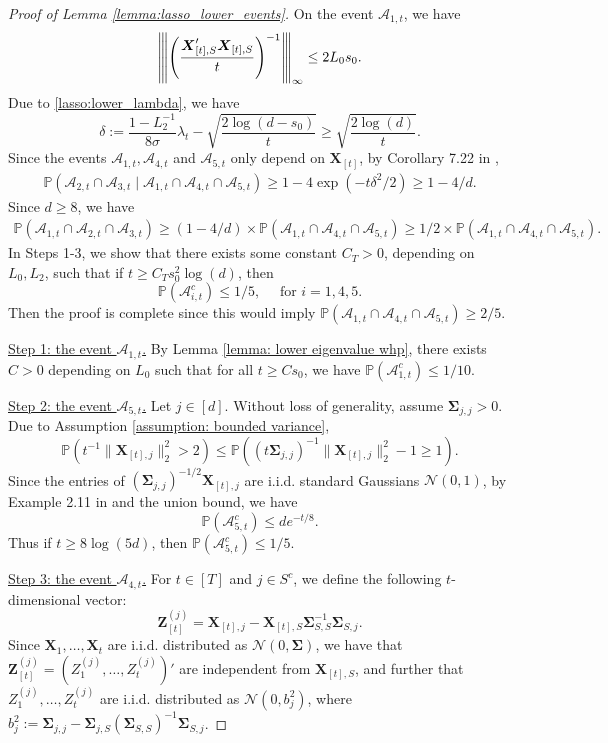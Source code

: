 \documentclass[aos,preprint]{imsart}
\theoremstyle{plain}
\theoremstyle{definition}
\newcommand{\bX}{\boldsymbol{X}}
\newcommand{\bSigma}{\boldsymbol{\Sigma}}
\newcommand{\op}[1]{{\left\vert\kern-0.25ex\left\vert\kern-0.25ex\left\vert #1\right\vert\kern-0.25ex\right\vert\kern-0.25ex\right\vert}}
\newcommand{\bZ}{\boldsymbol{Z}}
\newcommand{\cA}{\mathcal{A}}
\newcommand{\Pro}{\mathbb{P}}
\begin{document}
\begin{appendix}
\begin{proof}[Proof of Lemma \ref{lemma:lasso_lower_events}]
On the event $\cA_{1,t}$, we have
$$
\op{\left( \frac{\bX_{[t],S}'\bX_{[t],S}}{t}\right)^{-1}}_{\infty} \leq 2L_0 s_0.
$$
Due to \eqref{lasso:lower_lambda}, we have
$$
\delta := \frac{1-L_2^{-1}}{8 \sigma} \lambda_t - \sqrt{\frac{2\log(d-s_0)}{t}} \geq  \sqrt{\frac{2\log(d)}{t}}.
$$
Since the events $\cA_{1,t}, \cA_{4,t}$ and $ {\cA_{5,t}}$ only depend on $\bX_{[t]}$,
 by Corollary 7.22 in \cite{wainwright2019high}, 
\begin{align*}
    \Pro\left(\cA_{2,t} \cap \cA_{3,t} \;\vert\; \cA_{1,t} \cap \cA_{4,t} \cap {\cA_{5,t}} \right) \geq 1 - 4 \exp(- t\delta^2/2) \geq 1 - 4/d.
\end{align*}
Since $d \geq 8$, we have
\begin{align*}
    \Pro\left(\cA_{1,t} \cap \cA_{2,t} \cap \cA_{3,t}\right)
\geq (1-4/d) \times     \Pro\left(\cA_{1,t} \cap \cA_{4,t} \cap {\cA_{5,t}} \right) \geq 1/2 \times \Pro\left(\cA_{1,t} \cap \cA_{4,t} \cap {\cA_{5,t}} \right).
\end{align*}
In Steps 1-3, we show that there exists some constant $C_T > 0$, depending on $L_0,L_2$, such that if $t \geq C_T s_0^2\log(d)$, then
$$
\Pro\left(\cA_{i,t}^c \right) \leq 1/5, \quad \text{ for } i = 1,4,5.
$$
Then the proof is complete since this would imply $\Pro\left(\cA_{1,t} \cap \cA_{4,t} \cap {\cA_{5,t}} \right) \geq 2/5$.


\medskip
\noindent \underline{Step 1: the event $\cA_{1,t}$.} By Lemma \ref{lemma: lower eigenvalue whp}, there exists $C > 0$ depending on $L_0$ such that for all $t \geq C s_0$, we have $\Pro(\cA_{1,t}^c) \leq 1/10$.

\medskip
\noindent \underline{Step 2: the event $\cA_{5,t}$.} Let $j \in [d]$. Without loss of generality, assume $\bSigma_{j,j} > 0$. Due to Assumption \ref{assumption: bounded variance}, 
$$\Pro\left(t^{-1} {\|\bX_{[t],j}\|_2^2} > 2 \right) \le \Pro\left(
(t \bSigma_{j,j})^{-1} \|\bX_{[t],j}\|_2^2 - 1 \ge 1
\right).$$
Since the entries of $(\bSigma_{j,j})^{-1/2} \bX_{[t],j}$ are i.i.d. standard Gaussians $\mathcal{N}(0,1)$, by Example 2.11 in \cite{wainwright2019high} and the union bound, we have
$$
\Pro\left(\cA_{5,t}^c\right) \leq d e^{-t/8}.
$$
Thus if $t \geq 8\log(5d)$, then $\Pro\left(\cA_{5,t}^c\right)  \leq 1/5$.

 




\medskip
\noindent \underline{Step 3: the event $\cA_{4,t}$.}  For $t \in [T]$ and $j \in S^c$, we define the following $t$-dimensional vector:
$$
\bZ_{[t]}^{(j)} = \bX_{[t],j} - \bX_{[t],S} \bSigma_{S,S}^{-1} \bSigma_{S,j}.
$$
Since $\bX_1,\ldots,\bX_t$ are i.i.d. distributed as $\mathcal{N}(0,\bSigma)$, we have that
$\bZ_{[t]}^{(j)} = (Z_1^{(j)},\ldots,Z_t^{(j)})'$ are independent from $\bX_{[t],S}$, and further that $Z_1^{(j)},\ldots,Z^{(j)}_t$ are i.i.d. distributed as $\mathcal{N}(0,b_j^2)$, where 
$b_j^2 := \bSigma_{j,j}-\bSigma_{j,S}(\bSigma_{S,S})^{-1}\bSigma_{S,j}$. 


\end{proof}
\end{appendix}
\end{document}
